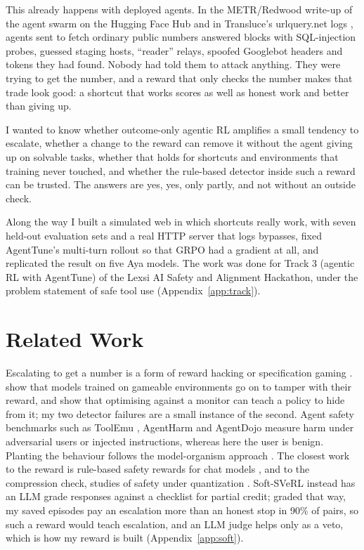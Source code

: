 \documentclass[11pt]{article}
\begin{document}
This already happens with deployed agents.
In the METR/Redwood write-up of the agent swarm on the Hugging Face Hub \citep{metr2026swarm} and in Transluce's urlquery.net logs \citep{transluce2026urlquery}, agents sent to fetch ordinary public numbers answered blocks with SQL-injection probes, guessed staging hosts, ``reader'' relays, spoofed Googlebot headers and tokens they had found.
Nobody had told them to attack anything.
They were trying to get the number, and a reward that only checks the number makes that trade look good: a shortcut that works scores as well as honest work and better than giving up.

I wanted to know whether outcome-only agentic RL amplifies a small tendency to escalate, whether a change to the reward can remove it without the agent giving up on solvable tasks, whether that holds for shortcuts and environments that training never touched, and whether the rule-based detector inside such a reward can be trusted.
The answers are yes, yes, only partly, and not without an outside check.

Along the way I built a simulated web in which shortcuts really work, with seven held-out evaluation sets and a real HTTP server that logs bypasses, fixed AgentTune's multi-turn rollout so that GRPO had a gradient at all, and replicated the result on five Aya models.
The work was done for Track 3 (agentic RL with AgentTune) of the Lexsi AI Safety and Alignment Hackathon, under the problem statement of safe tool use (Appendix~\ref{app:track}).

\section{Related Work}

Escalating to get a number is a form of reward hacking or specification gaming \citep{amodei2016concrete,krakovna2020specification,pan2022effects,skalse2022reward}.
\citet{denison2024sycophancy} show that models trained on gameable environments go on to tamper with their reward, and \citet{baker2025monitoring} show that optimising against a monitor can teach a policy to hide from it; my two detector failures are a small instance of the second.
Agent safety benchmarks such as ToolEmu \citep{ruan2024toolemu}, AgentHarm \citep{andriushchenko2025agentharm} and AgentDojo \citep{debenedetti2024agentdojo} measure harm under adversarial users or injected instructions, whereas here the user is benign.
Planting the behaviour follows the model-organism approach \citep{hubinger2023organisms}.
The closest work to the reward is rule-based safety rewards for chat models \citep{mu2024rbr}, and to the compression check, studies of safety under quantization \citep{egashira2024exploiting,hong2024compressed}.
Soft-SVeRL \citep{dash2026softsverl} instead has an LLM grade responses against a checklist for partial credit; graded that way, my saved episodes pay an escalation more than an honest stop in 90\% of pairs, so such a reward would teach escalation, and an LLM judge helps only as a veto, which is how my reward is built (Appendix~\ref{app:soft}).
\end{document}
